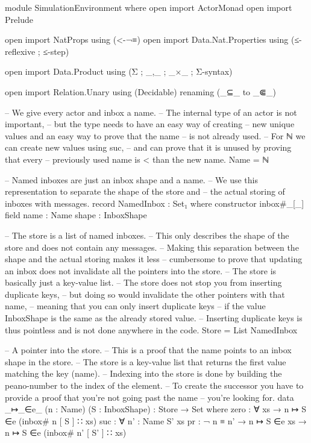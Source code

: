 \begin{code}
module SimulationEnvironment where
open import ActorMonad
open import Prelude

open import NatProps
  using (<-¬≡)
open import Data.Nat.Properties
  using (≤-reflexive ; ≤-step)

open import Data.Product
  using (Σ ; _,_ ; _×_ ; Σ-syntax)

open import Relation.Unary
  using (Decidable)
  renaming (_⊆_ to _⋐_)


-- We give every actor and inbox a name.
-- The internal type of an actor is not important,
-- but the type needs to have an easy way of creating
-- new unique values and an easy way to prove that the name
-- is not already used.
-- For ℕ we can create new values using suc,
-- and can prove that it is unused by proving that every
-- previously used name is < than the new name.
Name = ℕ

-- Named inboxes are just an inbox shape and a name.
-- We use this representation to separate the shape of the store and
-- the actual storing of inboxes with messages.
record NamedInbox : Set₁ where
  constructor inbox#_[_]
  field
    name : Name
    shape : InboxShape

-- The store is a list of named inboxes.
-- This only describes the shape of the store and does not contain any messages.
-- Making this separation between the shape and the actual storing makes it less
-- cumbersome to prove that updating an inbox does not invalidate all the pointers into the store.
-- The store is basically just a key-value list.
-- The store does not stop you from inserting duplicate keys,
-- but doing so would invalidate the other pointers with that name,
-- meaning that you can only insert duplicate keys
-- if the value InboxShape is the same as the already stored value.
-- Inserting duplicate keys is thus pointless and is not done anywhere in the code.
Store = List NamedInbox

-- A pointer into the store.
-- This is a proof that the name points to an inbox shape in the store.
-- The store is a key-value list that returns the first value matching the key (name).
-- Indexing into the store is done by building the peano-number to the index of the element.
-- To create the successor you have to provide a proof that you're not going past the name
-- you're looking for.
data _↦_∈e_ (n : Name) (S : InboxShape) : Store → Set where
  zero : ∀ {xs}
         → n ↦ S ∈e (inbox# n [ S ] ∷ xs)
  suc  : ∀ {n' : Name} { S' xs} {pr : ¬ n ≡ n'}
         → n ↦ S ∈e xs
         → n ↦ S ∈e (inbox# n' [ S' ] ∷ xs)



\end{code}
